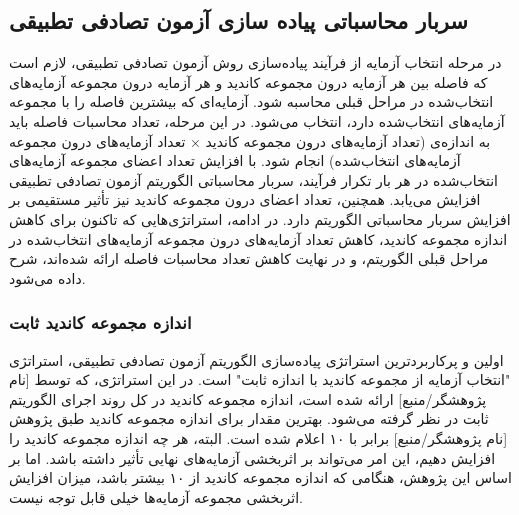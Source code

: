 \subsection{سربار محاسباتی پیاده سازی آزمون تصادفی تطبیقی}
در مرحله انتخاب آزمایه از فرآیند پیاده‌سازی روش آزمون تصادفی تطبیقی، لازم است که فاصله بین هر آزمایه درون مجموعه کاندید و هر آزمایه درون مجموعه آزمایه‌های انتخاب‌شده در مراحل قبلی محاسبه شود. آزمایه‌ای که بیشترین فاصله را با مجموعه آزمایه‌های انتخاب‌شده دارد، انتخاب می‌شود. در این مرحله، تعداد محاسبات فاصله باید به اندازه‌ی (تعداد آزمایه‌های درون مجموعه کاندید × تعداد آزمایه‌های درون مجموعه آزمایه‌های انتخاب‌شده) انجام شود. با افزایش تعداد اعضای مجموعه آزمایه‌های انتخاب‌شده در هر بار تکرار فرآیند، سربار محاسباتی الگوریتم آزمون تصادفی تطبیقی افزایش می‌یابد. همچنین، تعداد اعضای درون مجموعه کاندید نیز تأثیر مستقیمی بر افزایش سربار محاسباتی الگوریتم دارد. در ادامه، استراتژی‌هایی که تاکنون برای کاهش اندازه مجموعه کاندید، کاهش تعداد آزمایه‌های درون مجموعه آزمایه‌های انتخاب‌شده در مراحل قبلی الگوریتم، و در نهایت کاهش تعداد محاسبات فاصله ارائه شده‌اند، شرح داده می‌شود.

\subsubsection{اندازه مجموعه کاندید ثابت}
اولین و پرکاربردترین استراتژی پیاده‌سازی الگوریتم آزمون تصادفی تطبیقی، استراتژی "انتخاب آزمایه از مجموعه کاندید با اندازه ثابت" است. در این استراتژی، که توسط [نام پژوهشگر/منبع] ارائه شده است، اندازه مجموعه کاندید در کل روند اجرای الگوریتم ثابت در نظر گرفته می‌شود. بهترین مقدار برای اندازه مجموعه کاندید طبق پژوهش [نام پژوهشگر/منبع] برابر با ۱۰ اعلام شده است. البته، هر چه اندازه مجموعه کاندید را افزایش دهیم، این امر می‌تواند بر اثربخشی آزمایه‌های نهایی تأثیر داشته باشد. اما بر اساس این پژوهش، هنگامی که اندازه مجموعه کاندید از ۱۰ بیشتر باشد، میزان افزایش اثربخشی مجموعه آزمایه‌ها خیلی قابل توجه نیست.

